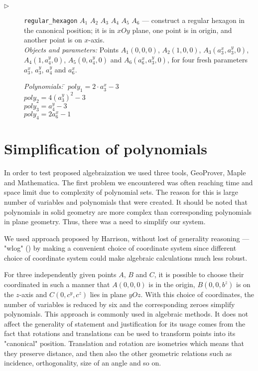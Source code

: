 \documentclass[final,1p,times,authoryear]{elsarticle}
\begin{document}
\begin{description}
\item[$\triangleright$] {\tt regular\_hexagon} $A_1$ $A_2$ $A_3$ $A_4$
  $A_5$ $A_6$ --- construct a regular hexagon in the canonical
  position; it is in $xOy$ plane, one point is in origin, and another
  point is on $x$-axis. \\
  {\em Objects and parameters:} Points $A_1(0, 0, 0)$, $A_2(1, 0, 0)$,
  $A_3(a_3^x, a_3^y, 0)$, $A_4(1, a_4^y, 0)$, $A_5(0, a_4^y, 0)$ and
  $A_6(a_6^x, a_3^y, 0)$, for four fresh parameters $a_3^x$, $a_3^y$,
  $a_4^y$ and $a_6^x$.

\begin{tabbing}
{\em Polynomials:} \= $poly_1 = 2\cdot a_3^x - 3$ \\
                   \> $poly_2 = 4(a_3^y)^2 - 3$ \\
                   \> $poly_3 = a_4^y - 3$ \\
                   \> $poly_4 = 2a_6^x - 1$
\end{tabbing}
\end{description}


\section{Simplification of polynomials}
\label{simplification}

In order to test proposed algebraization we used three tools,
GeoProver, Maple and Mathematica. The first problem we encountered was
often reaching time and space limit due to complexity of polynomial
sets. The reason for this is large number of variables and polynomials
that were created. It should be noted that polynomials in solid
geometry are more complex than corresponding polynomials in plane
geometry. Thus, there was a need to simplify our system.

We used approach proposed by Harrison, without lost of generality
reasoning --- "wlog" (\cite{harrison}) by making a convenient choice
of coordinate system since different choice of coordinate system could
make algebraic calculations much less robust.

For three independently given points $A$, $B$ and $C$, it is possible
to choose their coordinated in such a manner that $A(0, 0, 0)$ is in
the origin, $B(0, 0, b^z)$ is on the $z$-axis and $C(0, c^y, c^z)$
lies in plane $yOz$. With this choice of coordinates, the number of
variables is reduced by six and the corresponding zeroes simplify
polynomials. This approach is commonly used in algebraic methods. It
does not affect the generality of statement and justification for its
usage comes from the fact that rotations and translations can be used
to transform points into its "canonical" position. Translation and
rotation are isometries which means that they preserve distance, and
then also the other geometric relations such as incidence,
orthogonality, size of an angle and so on.
\end{document}
